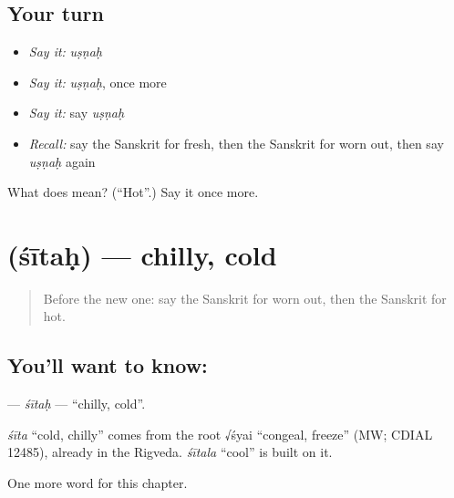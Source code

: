 \subsection*{Your turn}
\begin{itemize}
\raggedright
  \item \emph{Say it:} \emph{uṣṇaḥ}
  \item \emph{Say it:} \emph{uṣṇaḥ}, once more
  \item \emph{Say it:} say \emph{uṣṇaḥ}
  \item \emph{Recall:} say the Sanskrit for fresh, then the Sanskrit for worn out, then say \emph{uṣṇaḥ} again
\end{itemize}

\begin{tcolorbox}[breakable,colback=teal!4,colframe=teal!35!black,title={Before you move on}]
What does  mean? (\textquotedblleft{}Hot\textquotedblright{}.) Say it once more.
\end{tcolorbox}
\section[\texorpdfstring{\sk{शीतः} (śītaḥ)}{शीतः (śītaḥ)}]{ (śītaḥ) — chilly, cold}

\label{lesson:SA-C155-sitah}



\begin{quote}
Before the new one: say the Sanskrit for worn out, then the Sanskrit for hot.
\end{quote}

\subsection*{You'll want to know: }
\textbf{} — \emph{śītaḥ} — \textquotedblleft{}chilly, cold\textquotedblright{}.

\begin{cousinweb}
\emph{śīta} \textquotedblleft{}cold, chilly\textquotedblright{} comes from the root √śyai \textquotedblleft{}congeal, freeze\textquotedblright{} (MW; CDIAL 12485), already in the Rigveda. \emph{śītala} \textquotedblleft{}cool\textquotedblright{} is built on it.
\end{cousinweb}

\begin{grammarlens}[title={What you've built}]
One more word for this chapter.
\end{grammarlens}

